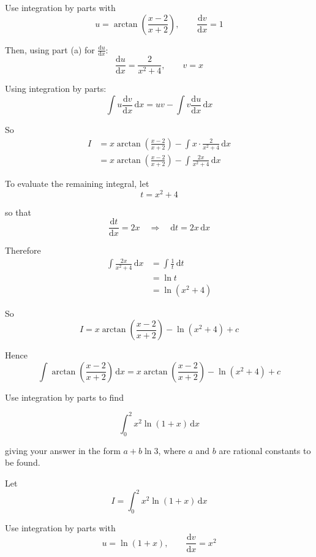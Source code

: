 \documentclass[leqno]{article}
\begin{document}
\begin{enumerate}[
  label=\textbf{\arabic*.},
  leftmargin=*,
  topsep=0pt,
  partopsep=0pt,
  parsep=0pt
]
\begin{djsSolution}
\begin{enumerate}[label=\textbf{(\alph*)}]
Use integration by parts with
\[
u=\arctan\left(\frac{x-2}{x+2}\right),
\qquad
\frac{\mathrm{d}v}{\mathrm{d}x}=1
\]

Then, using part (a) for \(\frac{\mathrm{d}u}{\mathrm{d}x}\):
\[
\frac{\mathrm{d}u}{\mathrm{d}x}=\frac{2}{x^2+4},
\qquad
v=x
\]

Using integration by parts:
\[
\int u\frac{\mathrm{d}v}{\mathrm{d}x}\,\mathrm{d}x = uv - \int v\frac{\mathrm{d}u}{\mathrm{d}x}\,\mathrm{d}x
\]

So
\begin{align*}
I
&=x\arctan\left(\frac{x-2}{x+2}\right)-\int x\cdot \frac{2}{x^2+4}\,\mathrm{d}x \\
&=x\arctan\left(\frac{x-2}{x+2}\right)-\int \frac{2x}{x^2+4}\,\mathrm{d}x
\end{align*}

To evaluate the remaining integral, let
\[
t=x^2+4
\]

so that
\[
\frac{\mathrm{d}t}{\mathrm{d}x}=2x
\quad\Longrightarrow\quad
\mathrm{d}t=2x\,\mathrm{d}x
\]

Therefore
\begin{align*}
\int \frac{2x}{x^2+4}\,\mathrm{d}x
&=\int \frac{1}{t}\,\mathrm{d}t \\
&=\ln t \\
&=\ln(x^2+4)
\end{align*}

So
\[
I=x\arctan\left(\frac{x-2}{x+2}\right)-\ln(x^2+4)+c
\]

Hence
\[
\int \arctan\left(\frac{x-2}{x+2}\right)\,\mathrm{d}x
=
x\arctan\left(\frac{x-2}{x+2}\right)-\ln(x^2+4)+c
\]
\end{enumerate}
\end{djsSolution}


\newpage

\questionitem
Use integration by parts to find


  \[
  \int_0^2 x^2 \ln(1+x)\,\mathrm{d}x
  \]
  
  giving your answer in the form $a + b\ln 3$, where $a$ and $b$ are rational constants to be found.  \\

\vspace*{10pt}

\begin{djsSolution}
Let
\[
I=\int_0^2 x^2\ln(1+x)\,\mathrm{d}x
\]

Use integration by parts with
\[
u=\ln(1+x), \qquad \frac{\mathrm{d}v}{\mathrm{d}x}=x^2
\]


\end{djsSolution}
\end{enumerate}
\end{document}

